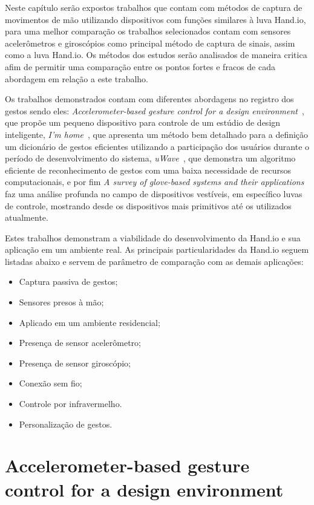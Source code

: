 Neste capítulo serão expostos trabalhos que contam com métodos de captura de movimentos de mão utilizando dispositivos com funções similares à luva Hand.io, para uma melhor comparação os trabalhos selecionados contam com sensores acelerômetros e giroscópios como principal método de captura de sinais, assim como a luva Hand.io. Os métodos dos estudos serão analisados de maneira critica afim de permitir uma comparação entre os pontos fortes e fracos de cada abordagem em relação a este trabalho.

Os trabalhos demonstrados contam com diferentes abordagens no registro dos gestos sendo eles: \textit{Accelerometer-based gesture control for a design environment}~\cite{accelerometer:2006}, que propõe um pequeno dispositivo para controle de um estúdio de design inteligente,   \textit{I'm home}~\cite{imhome:2011}, que apresenta um método bem detalhado para a definição um dicionário de gestos eficientes utilizando a participação dos usuários durante o período de desenvolvimento do sistema, \textit{uWave}~\cite{uwave:2009}, que demonstra um algoritmo eficiente de reconhecimento de gestos com uma baixa necessidade de recursos computacionais, e por fim \textit{A survey of glove-based systems and their applications}~\cite{survey:2008} faz uma análise profunda no campo de dispositivos vestíveis, em específico luvas de controle, mostrando desde os dispositivos mais primitivos até os utilizados atualmente. 

Estes trabalhos demonstram a viabilidade do desenvolvimento da Hand.io e sua aplicação em um ambiente real. As principais particularidades da Hand.io seguem listadas abaixo e servem de parâmetro de comparação com as demais aplicações:
\begin{itemize}
	\item Captura passiva de gestos;
    \item Sensores presos à mão;
    \item Aplicado em um ambiente residencial;
    \item Presença de sensor acelerômetro;
    \item Presença de sensor giroscópio;
    \item Conexão sem fio;
    \item Controle por infravermelho.
    \item Personalização de gestos.
\end{itemize}


\section{Accelerometer-based gesture control for a design environment}

